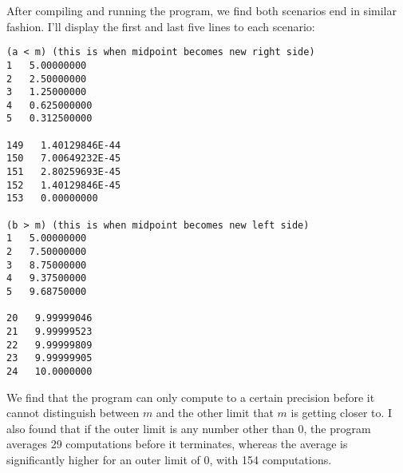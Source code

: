 \documentclass[12pt]{article}
\begin{document}
After compiling and running the program, we find both scenarios end in similar fashion. I'll display the first and last five lines to each scenario:

\begin{verbatim}
(a < m) (this is when midpoint becomes new right side)
1   5.00000000
2   2.50000000
3   1.25000000
4   0.625000000
5   0.312500000
					
149   1.40129846E-44
150   7.00649232E-45
151   2.80259693E-45
152   1.40129846E-45
153   0.00000000

(b > m) (this is when midpoint becomes new left side)
1   5.00000000
2   7.50000000
3   8.75000000
4   9.37500000
5   9.68750000
					
20   9.99999046
21   9.99999523
22   9.99999809
23   9.99999905
24   10.0000000
\end{verbatim}

We find that the program can only compute to a certain precision before it cannot distinguish between $m$ and the other limit that $m$ is getting closer to. I also found that if the outer limit is any number other than $0$, the program averages 29 computations before it terminates, whereas the average is significantly higher for an outer limit of $0$, with 154 computations.
\end{document}
